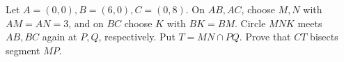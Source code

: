Let $A=(0,0),B=(6,0),C=(0,8)$. On $AB,AC$, choose $M,N$ with $AM=AN=3$, and on $BC$ choose $K$ with $BK=BM$. Circle $MNK$ meets $AB,BC$ again at $P,Q$, respectively. Put $T=MN\cap PQ$. Prove that $CT$ bisects segment $MP$.
